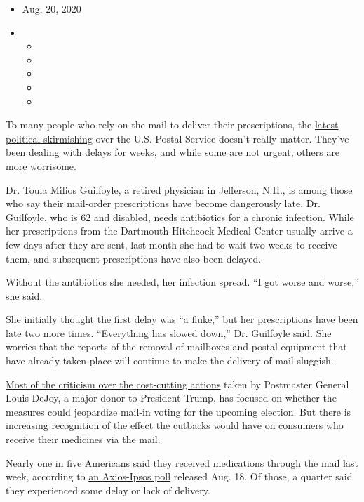 \begin{itemize}
\item
  Aug. 20, 2020
\item
  \begin{itemize}
  \item
  \item
  \item
  \item
  \item
  \end{itemize}
\end{itemize}

To many people who rely on the mail to deliver their prescriptions, the
\href{https://www.nytimes3xbfgragh.onion/2020/08/18/us/politics/postal-service-suspends-changes.html?searchResultPosition=6}{latest
political skirmishing} over the U.S. Postal Service doesn't really
matter. They've been dealing with delays for weeks, and while some are
not urgent, others are more worrisome.

Dr. Toula Milios Guilfoyle, a retired physician in Jefferson, N.H., is
among those who say their mail-order prescriptions have become
dangerously late. Dr. Guilfoyle, who is 62 and disabled, needs
antibiotics for a chronic infection. While her prescriptions from the
Dartmouth-Hitchcock Medical Center usually arrive a few days after they
are sent, last month she had to wait two weeks to receive them, and
subsequent prescriptions have also been delayed.

Without the antibiotics she needed, her infection spread. ``I got worse
and worse,'' she said.

She initially thought the first delay was ``a fluke,'' but her
prescriptions have been late two more times. ``Everything has slowed
down,'' Dr. Guilfoyle said. She worries that the reports of the removal
of mailboxes and postal equipment that have already taken place will
continue to make the delivery of mail sluggish.

\href{https://www.nytimes3xbfgragh.onion/2020/08/15/us/post-office-vote-by-mail.html?action=click\&module=RelatedLinks\&pgtype=Article}{Most
of the criticism over the cost-cutting actions} taken by Postmaster
General Louis DeJoy, a major donor to President Trump, has focused on
whether the measures could jeopardize mail-in voting for the upcoming
election. But there is increasing recognition of the effect the cutbacks
would have on consumers who receive their medicines via the mail.

Nearly one in five Americans said they received medications through the
mail last week, according to
\href{https://www.ipsos.com/en-us/news-polls/axios-ipsos-coronavirus-index}{an
Axios-Ipsos poll} released Aug. 18. Of those, a quarter said they
experienced some delay or lack of delivery.

